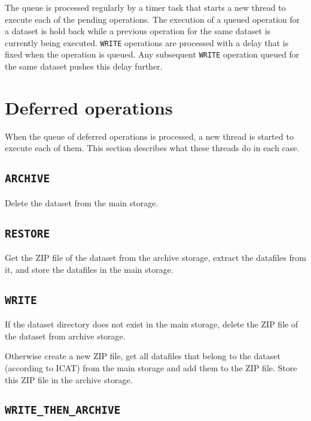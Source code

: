 \documentclass[paper=a4]{scrartcl}
\begin{document}
The queue is processed regularly by a timer task that starts a new
thread to execute each of the pending operations.  The execution of a
queued operation for a dataset is hold back while a previous operation
for the same dataset is currently being executed.  \texttt{WRITE}
operations are processed with a delay that is fixed when the operation
is queued.  Any subsequent \texttt{WRITE} operation queued for the
same dataset pushes this delay further.


\section{Deferred operations}
\label{sec:defops}

When the queue of deferred operations is processed, a new thread is
started to execute each of them.  This section describes what these
threads do in each case.

\subsection{\texttt{ARCHIVE}}
\label{sec:defops:archive}

Delete the dataset from the main storage.

\subsection{\texttt{RESTORE}}
\label{sec:defops:restore}

Get the ZIP file of the dataset from the archive storage, extract the
datafiles from it, and store the datafiles in the main storage.

\subsection{\texttt{WRITE}}
\label{sec:defops:write}

If the dataset directory does not exist in the main storage, delete
the ZIP file of the dataset from archive storage.

Otherwise create a new ZIP file, get all datafiles that belong to the
dataset (according to ICAT) from the main storage and add them to the
ZIP file.  Store this ZIP file in the archive storage.

\subsection{\texttt{WRITE\_THEN\_ARCHIVE}}
\label{sec:defops:writethenarchive}
\end{document}
